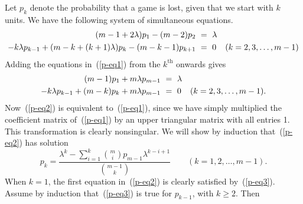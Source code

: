 \documentclass[11pt]{article}
\theoremstyle{definition}
\theoremstyle{remark}
\begin{document}
Let $p_k$ denote the probability that a game is lost, given that
we start with $k$ units. We have the following system of
simultaneous equations.
\begin{align}\label{p-eq1}
    (m-1+2\lambda)p_1 - (m-2)p_2\ &=\ \lambda& \notag\\
   -k\lambda p_{k-1}+(m-k+(k+1)\lambda)p_k-(m-k-1)p_{k+1}\ &=\ 0& (k=2,3,\ldots,m-1)
\end{align}
Adding the equations in~(\ref{p-eq1}) from the $k^\textrm{th}$ onwards
gives
\begin{align}\label{p-eq2}
    (m-1)p_1 + m\lambda p_{m-1}\ &=\ \lambda& \notag\\
   -k\lambda p_{k-1}+(m-k)p_k+ m\lambda p_{m-1}\ &=\ 0& (k=2,3,\ldots,m-1).
\end{align}
Now~(\ref{p-eq2}) is equivalent to~(\ref{p-eq1}), since we have
simply multiplied the coefficient matrix of~(\ref{p-eq1}) by an
upper triangular matrix with all entries 1. This transformation is
clearly nonsingular. We will show by induction that~(\ref{p-eq2}) has solution%
\begin{equation}\label{p-eq3}
    p_k=\frac{\lambda^k-\sum_{i=1}^k \binom{m}{i}p_{m-1}\lambda^{k-i+1}}{\binom{m-1}{k}}
\qquad(k=1,2,\ldots,m-1).
\end{equation}%
When $k=1$, the first equation in~(\ref{p-eq2}) is clearly
satisfied by~(\ref{p-eq3}).  Assume by induction
that~(\ref{p-eq3}) is true for $p_{k-1}$, with $k\geq 2$. Then
\end{document}
